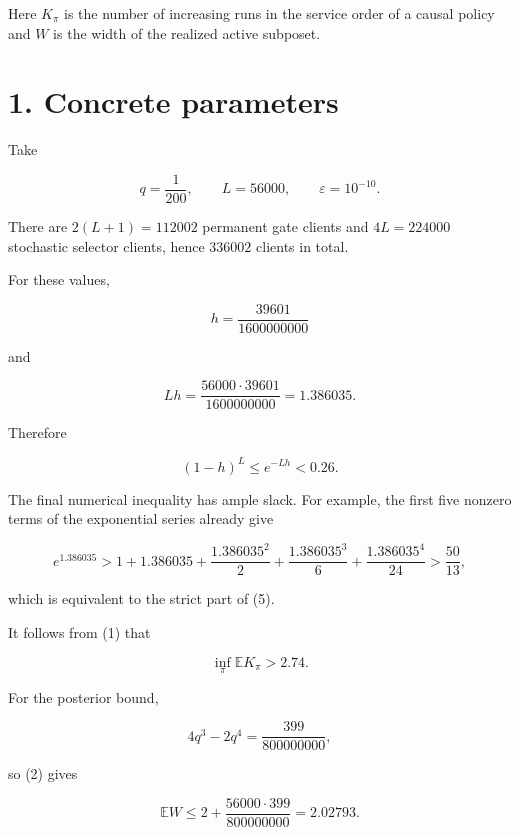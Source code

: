 \documentclass[11pt,a4paper]{article}
\begin{document}
Here \(K_\pi\) is the number of increasing runs in the service order of a causal policy and \(W\) is the width of the realized active subposet.


\section*{1. Concrete parameters}

Take


\begin{equation}
             q=\frac1{200},\qquad L=56000,\qquad
             \varepsilon=10^{-10}.
\tag{3}
\end{equation}

There are \(2(L+1)=112002\) permanent gate clients and \(4L=224000\) stochastic selector clients, hence \(336002\) clients in total.


For these values,


\[
 h=\frac{39601}{1600000000}
\]

and


\begin{equation}
 Lh
 =\frac{56000\cdot39601}{1600000000}
 =1.386035.
\tag{4}
\end{equation}

Therefore


\begin{equation}
 (1-h)^L\le e^{-Lh}<0.26.
\tag{5}
\end{equation}

The final numerical inequality has ample slack.  For example, the first five nonzero terms of the exponential series already give


\[
 e^{1.386035}
 >
 1+1.386035+\frac{1.386035^2}{2}
 +\frac{1.386035^3}{6}
 +\frac{1.386035^4}{24}
 >\frac{50}{13},
\]

which is equivalent to the strict part of (5).


It follows from (1) that


\begin{equation}
                 \inf_\pi\mathbb E K_\pi>2.74.
\tag{6}
\end{equation}

For the posterior bound,


\[
 4q^3-2q^4
 =\frac{399}{800000000},
\]

so (2) gives


\begin{equation}
 \mathbb EW
 \le 2+\frac{56000\cdot399}{800000000}
 =2.02793.
\tag{7}
\end{equation}
\end{document}
